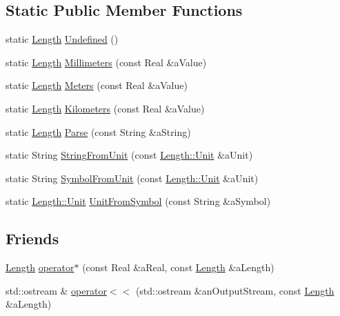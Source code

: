 \subsection*{Static Public Member Functions}
\begin{DoxyCompactItemize}
\item 
static \hyperlink{classlibrary_1_1physics_1_1units_1_1_length}{Length} \hyperlink{classlibrary_1_1physics_1_1units_1_1_length_a5dc80bc442d377701cf052c5bd27bef6}{Undefined} ()
\item 
static \hyperlink{classlibrary_1_1physics_1_1units_1_1_length}{Length} \hyperlink{classlibrary_1_1physics_1_1units_1_1_length_a291b337e409be3e9a13fa697867eb5c8}{Millimeters} (const Real \&a\+Value)
\item 
static \hyperlink{classlibrary_1_1physics_1_1units_1_1_length}{Length} \hyperlink{classlibrary_1_1physics_1_1units_1_1_length_ad523a3737d5c3f23a64588eac83f2148}{Meters} (const Real \&a\+Value)
\item 
static \hyperlink{classlibrary_1_1physics_1_1units_1_1_length}{Length} \hyperlink{classlibrary_1_1physics_1_1units_1_1_length_a28e457b910a96d1eb2bdf661d815478a}{Kilometers} (const Real \&a\+Value)
\item 
static \hyperlink{classlibrary_1_1physics_1_1units_1_1_length}{Length} \hyperlink{classlibrary_1_1physics_1_1units_1_1_length_a4f48acd4abba06a7fc15bbc5ee48fe63}{Parse} (const String \&a\+String)
\item 
static String \hyperlink{classlibrary_1_1physics_1_1units_1_1_length_a2e5796c1a5f36b168cd0ddaa03381299}{String\+From\+Unit} (const \hyperlink{classlibrary_1_1physics_1_1units_1_1_length_a3b8b39cd245cf6b19dc34459baeccb18}{Length\+::\+Unit} \&a\+Unit)
\item 
static String \hyperlink{classlibrary_1_1physics_1_1units_1_1_length_a645313cc92b2863704275f9e8b3f8879}{Symbol\+From\+Unit} (const \hyperlink{classlibrary_1_1physics_1_1units_1_1_length_a3b8b39cd245cf6b19dc34459baeccb18}{Length\+::\+Unit} \&a\+Unit)
\item 
static \hyperlink{classlibrary_1_1physics_1_1units_1_1_length_a3b8b39cd245cf6b19dc34459baeccb18}{Length\+::\+Unit} \hyperlink{classlibrary_1_1physics_1_1units_1_1_length_af26d05f64f066bea686ed565c41eaf93}{Unit\+From\+Symbol} (const String \&a\+Symbol)
\end{DoxyCompactItemize}
\subsection*{Friends}
\begin{DoxyCompactItemize}
\item 
\hyperlink{classlibrary_1_1physics_1_1units_1_1_length}{Length} \hyperlink{classlibrary_1_1physics_1_1units_1_1_length_a72059ec2f1e930a0e75a3a808e434363}{operator$\ast$} (const Real \&a\+Real, const \hyperlink{classlibrary_1_1physics_1_1units_1_1_length}{Length} \&a\+Length)
\item 
std\+::ostream \& \hyperlink{classlibrary_1_1physics_1_1units_1_1_length_a95a13170a8d57cb0060eae94520eace4}{operator$<$$<$} (std\+::ostream \&an\+Output\+Stream, const \hyperlink{classlibrary_1_1physics_1_1units_1_1_length}{Length} \&a\+Length)
\end{DoxyCompactItemize}
